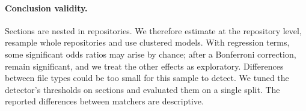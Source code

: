 \documentclass[sigconf,nonacm]{acmart}
\begin{document}


\paragraph{Conclusion validity.} Sections are nested in repositories. We therefore estimate at the
repository level, resample whole repositories and use clustered models. With \geeNTerms{} regression
terms, some significant odds ratios may arise by chance; after a Bonferroni correction,
\geeBonferroniCats{} remain significant, and we treat the other effects as exploratory. Differences
between file types could be too small for this sample to detect. We tuned the detector's thresholds
on \detectorNDev{} sections and evaluated them on a single split. The reported differences between
matchers are descriptive.
\end{document}

